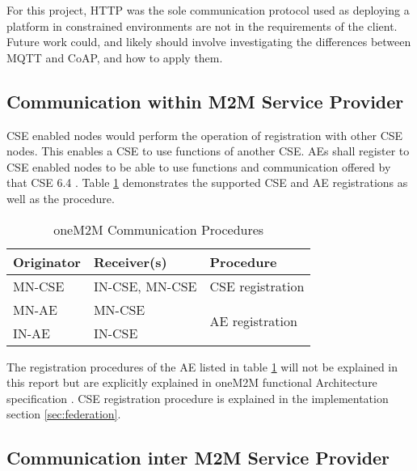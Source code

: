 For this project, HTTP was the sole communication protocol used as deploying a platform in constrained environments are not in the requirements of the client. Future work could, and likely should involve investigating the differences between MQTT and CoAP, and how to apply them. 

\subsection{Communication within M2M Service Provider}

CSE enabled nodes would perform the operation of registration with other CSE nodes. This enables a CSE to use functions of another CSE. AEs shall register to CSE enabled nodes to be able to use functions and communication offered by that CSE 6.4 \cite{oneM2M2016OneM2MArchitecture}. Table \ref{onem2m-communication-procedures} demonstrates the supported CSE and AE registrations as well as the procedure.  

\begin{table}[H]
\centering
\begin{tabular}{|l|l|l|}
\hline
\textbf{Originator} & \textbf{Receiver(s)} & \textbf{Procedure}               \\ \hline
MN-CSE              & IN-CSE, MN-CSE       & CSE registration                 \\ \hline
MN-AE               & MN-CSE               & \multirow{2}{*}{AE registration} \\ \cline{1-2}
IN-AE               & IN-CSE               &                                  \\\hline
\end{tabular}
\caption{oneM2M Communication Procedures}
\label{onem2m-communication-procedures}
\end{table}

The registration procedures of the AE listed in table \ref{onem2m-communication-procedures} will not be explained in this report but are explicitly explained in oneM2M functional Architecture specification \cite{oneM2M2016OneM2MArchitecture}. CSE registration procedure is explained in the implementation section \ref{sec:federation}.  

\subsection{Communication inter M2M Service Provider}

